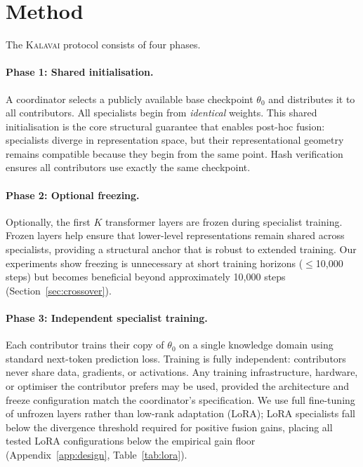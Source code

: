 \documentclass{article}
\newcommand{\kalavai}{\textsc{Kalavai}\xspace}
\begin{document}
\section{Method}
\label{sec:method}

The \kalavai protocol consists of four phases.

\paragraph{Phase 1: Shared initialisation.} A coordinator selects a publicly available base checkpoint $\theta_0$ and distributes it to all contributors. All specialists begin from \emph{identical} weights. This shared initialisation is the core structural guarantee that enables post-hoc fusion: specialists diverge in representation space, but their representational geometry remains compatible because they begin from the same point. Hash verification ensures all contributors use exactly the same checkpoint.

\paragraph{Phase 2: Optional freezing.} Optionally, the first $K$ transformer layers are frozen during specialist training. Frozen layers help ensure that lower-level representations remain shared across specialists, providing a structural anchor that is robust to extended training. Our experiments show freezing is unnecessary at short training horizons ($\leq$10,000 steps) but becomes beneficial beyond approximately 10,000 steps (Section~\ref{sec:crossover}).

\paragraph{Phase 3: Independent specialist training.} Each contributor trains their copy of $\theta_0$ on a single knowledge domain using standard next-token prediction loss. Training is fully independent: contributors never share data, gradients, or activations. Any training infrastructure, hardware, or optimiser the contributor prefers may be used, provided the architecture and freeze configuration match the coordinator's specification. We use full fine-tuning of unfrozen layers rather than low-rank adaptation (LoRA); LoRA specialists fall below the divergence threshold required for positive fusion gains, placing all tested LoRA configurations below the empirical gain floor (Appendix~\ref{app:design}, Table~\ref{tab:lora}).
\end{document}
